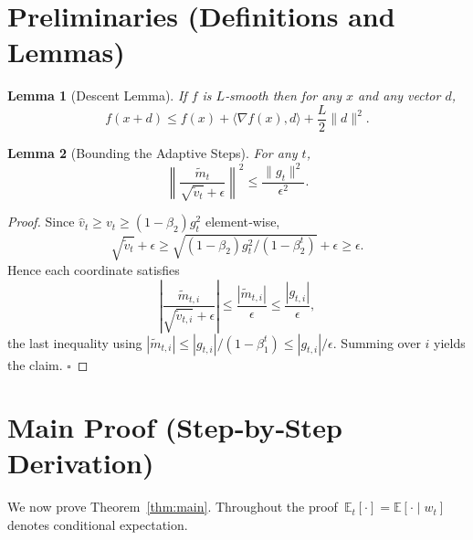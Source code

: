 \documentclass{article}
\newtheorem{lemma}{Lemma}
\newcommand{\EE}{\mathbb{E}}
\begin{document}
\section*{Preliminaries (Definitions and Lemmas)}
\begin{lemma}[Descent Lemma]\label{lem:descent}
If $f$ is $L$‑smooth then for any $x$ and any vector $d$,
\[
f(x+d)\le f(x)+\langle\nabla f(x),d\rangle+\frac{L}{2}\|d\|^2 .
\]
\end{lemma}
\begin{lemma}[Bounding the Adaptive Steps]\label{lem:step}
For any $t$,
\[
\left\|\frac{\tilde m_t}{\sqrt{\tilde v_t}+\epsilon}\right\|^2
\le \frac{\|g_t\|^2}{\epsilon^2}.
\]
\end{lemma}
\begin{proof}
Since $\hat v_t\ge v_t\ge (1-\beta_2)g_t^2$ element‑wise,
\[
\sqrt{\tilde v_t}+\epsilon\ge \sqrt{(1-\beta_2)g_t^2/(1-\beta_2^t)}+\epsilon
\ge \epsilon .
\]
Hence each coordinate satisfies
\[
\left|\frac{\tilde m_{t,i}}{\sqrt{\tilde v_{t,i}}+\epsilon}\right|
\le\frac{|\tilde m_{t,i}|}{\epsilon}
\le\frac{|g_{t,i}|}{\epsilon},
\]
the last inequality using $|\tilde m_{t,i}|\le |g_{t,i}|/(1-\beta_1^t)\le |g_{t,i}|/\epsilon$.
Summing over $i$ yields the claim. \hfill $\square$
\end{proof}

\section*{Main Proof (Step‑by‑Step Derivation)}
We now prove Theorem~\ref{thm:main}. Throughout the proof $\,\EE_t[\cdot]=\EE[\cdot\mid w_t]$ denotes conditional expectation.
\end{document}
